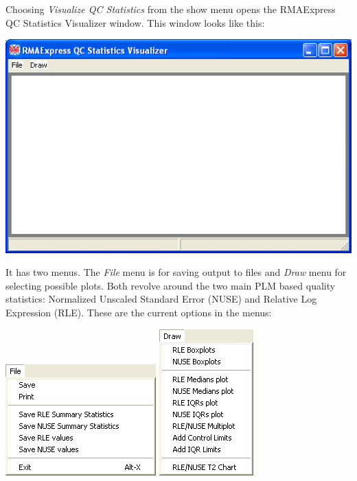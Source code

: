 \documentclass[11pt]{report}
\begin{document}
Choosing {\it  Visualize QC Statistics} from the show menu opens the RMAExpress QC Statistics Visualizer window. This window looks like this: 
\begin{center}
\includegraphics[scale=0.5]{QCVisualize1.png}
\end{center}

It has two menus. The {\it File} menu is for saving output to files and {\it Draw} menu for selecting possible plots. Both revolve around the two main PLM based quality statistics: Normalized Unscaled Standard Error (NUSE) and Relative Log Expression (RLE). These are the current options in the menus:
\begin{center}
\includegraphics[scale=0.5]{QCVisualize2.png}\hspace{0.5in}
\includegraphics[scale=0.5]{QCVisualize3.png} \\
\end{center}
\end{document}
